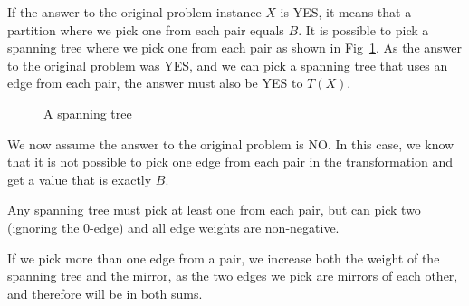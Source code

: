 \documentclass[11pt,a4paper]{article}
\begin{document}
If the answer to the original problem instance $X$ is YES, it means that a partition where we pick one from each pair equals $B$. It is possible to pick a spanning tree where we pick one from each pair as shown in Fig~\ref{fig:transform3}. As the answer to the original problem was YES, and we can pick a spanning tree that uses an edge from each pair, the answer must also be YES to $T(X)$.

\begin{figure}[htb]
\caption{A spanning tree}
\label{fig:transform3}
\end{figure}

We now assume the answer to the original problem is NO. In this case, we know that it is not possible to pick one edge from each pair in the transformation and get a value that is exactly $B$. 

Any spanning tree must pick at least one from each pair, but can pick two (ignoring the $0$-edge) and all edge weights are non-negative. 

If we pick more than one edge from a pair, we increase both the weight of the spanning tree and the mirror, as the two edges we pick are mirrors of each other, and therefore will be in both sums.
\end{document}
